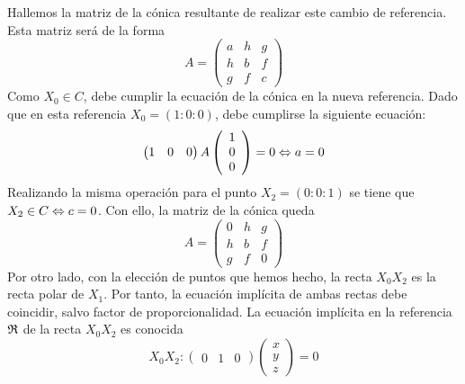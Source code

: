 Hallemos la matriz de la cónica resultante de realizar este cambio de referencia. Esta matriz será de la forma
\begin{equation*}
	A=\left( \begin{array}{ccc}
	a & h & g\\
	h & b & f\\
	g & f & c
	\end{array}\right) 
\end{equation*}
Como $X_0\in C$, debe cumplir la ecuación de la cónica en la nueva referencia. Dado que en esta referencia $X_0=(1:0:0)$, debe cumplirse la siguiente ecuación:
\begin{equation*}
	\begin{pmatrix}
		1 & 0 & 0
	\end{pmatrix}A 
	\left( \begin{array}{c}
		1\\0\\0
	\end{array}\right) =0\Leftrightarrow a=0
\end{equation*}
Realizando la misma operación para el punto $X_2=(0:0:1)$ se tiene que $X_2\in C\Leftrightarrow c=0$. Con ello, la matriz de la cónica queda
\begin{equation*}
	A=\left( \begin{array}{ccc}
		0 & h & g\\
		h & b & f\\
		g & f & 0
	\end{array}\right) 
\end{equation*}
Por otro lado, con la elección de puntos que hemos hecho, la recta $X_0X_2$ es la recta polar de $X_1$. Por tanto, la ecuación implícita de ambas rectas debe coincidir, salvo factor de proporcionalidad. La ecuación implícita en la referencia $\mathfrak{R}$ de la recta $X_0X_2$ es conocida 
\begin{equation*}
	X_0X_2:
	\begin{pmatrix}
		0 & 1& 0
	\end{pmatrix}
	\left( \begin{array}{c}
		x\\y\\z
	\end{array}\right)=0
\end{equation*}

